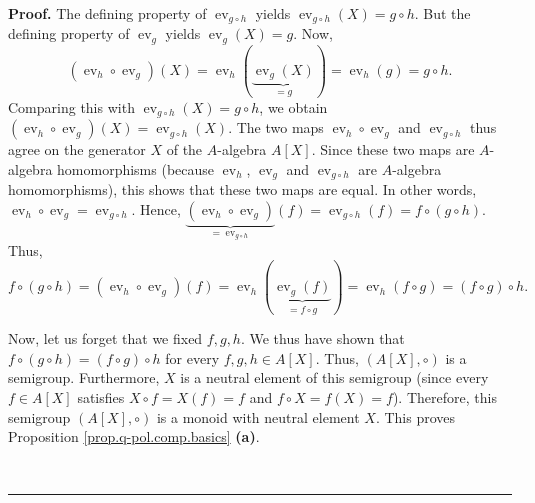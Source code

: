 \documentclass[numbers=enddot,12pt,final,onecolumn,notitlepage]{scrartcl}%
\theoremstyle{definition}
\newenvironment{proof}[1][Proof]{\noindent\textbf{#1.} }{\ \rule{0.5em}{0.5em}}
\begin{document}
\begin{proof}
The defining property of $\operatorname*{ev}\nolimits_{g\circ h}$ yields
$\operatorname*{ev}\nolimits_{g\circ h}\left(  X\right)  =g\circ h$. But the
defining property of $\operatorname*{ev}\nolimits_{g}$ yields
$\operatorname*{ev}\nolimits_{g}\left(  X\right)  =g$. Now,%
\[
\left(  \operatorname*{ev}\nolimits_{h}\circ\operatorname*{ev}\nolimits_{g}%
\right)  \left(  X\right)  =\operatorname*{ev}\nolimits_{h}\left(
\underbrace{\operatorname*{ev}\nolimits_{g}\left(  X\right)  }_{=g}\right)
=\operatorname*{ev}\nolimits_{h}\left(  g\right)  =g\circ h.
\]
Comparing this with $\operatorname*{ev}\nolimits_{g\circ h}\left(  X\right)
=g\circ h$, we obtain $\left(  \operatorname*{ev}\nolimits_{h}\circ
\operatorname*{ev}\nolimits_{g}\right)  \left(  X\right)  =\operatorname*{ev}%
\nolimits_{g\circ h}\left(  X\right)  $. The two maps $\operatorname*{ev}%
\nolimits_{h}\circ\operatorname*{ev}\nolimits_{g}$ and $\operatorname*{ev}%
\nolimits_{g\circ h}$ thus agree on the generator $X$ of the $A$-algebra
$A\left[  X\right]  $. Since these two maps are $A$-algebra homomorphisms
(because $\operatorname*{ev}\nolimits_{h}$, $\operatorname*{ev}\nolimits_{g}$
and $\operatorname*{ev}\nolimits_{g\circ h}$ are $A$-algebra homomorphisms),
this shows that these two maps are equal. In other words, $\operatorname*{ev}%
\nolimits_{h}\circ\operatorname*{ev}\nolimits_{g}=\operatorname*{ev}%
\nolimits_{g\circ h}$. Hence, $\underbrace{\left(  \operatorname*{ev}%
\nolimits_{h}\circ\operatorname*{ev}\nolimits_{g}\right)  }%
_{=\operatorname*{ev}\nolimits_{g\circ h}}\left(  f\right)
=\operatorname*{ev}\nolimits_{g\circ h}\left(  f\right)  =f\circ\left(  g\circ
h\right)  $. Thus,%
\[
f\circ\left(  g\circ h\right)  =\left(  \operatorname*{ev}\nolimits_{h}%
\circ\operatorname*{ev}\nolimits_{g}\right)  \left(  f\right)
=\operatorname*{ev}\nolimits_{h}\left(  \underbrace{\operatorname*{ev}%
\nolimits_{g}\left(  f\right)  }_{=f\circ g}\right)  =\operatorname*{ev}%
\nolimits_{h}\left(  f\circ g\right)  =\left(  f\circ g\right)  \circ h.
\]


Now, let us forget that we fixed $f,g,h$. We thus have shown that
$f\circ\left(  g\circ h\right)  =\left(  f\circ g\right)  \circ h$ for every
$f,g,h\in A\left[  X\right]  $. Thus, $\left(  A\left[  X\right]
,\circ\right)  $ is a semigroup. Furthermore, $X$ is a neutral element of this
semigroup (since every $f\in A\left[  X\right]  $ satisfies $X\circ f=X\left(
f\right)  =f$ and $f\circ X=f\left(  X\right)  =f$). Therefore, this semigroup
$\left(  A\left[  X\right]  ,\circ\right)  $ is a monoid with neutral element
$X$. This proves Proposition \ref{prop.q-pol.comp.basics} \textbf{(a)}.


\end{proof}
\end{document}
